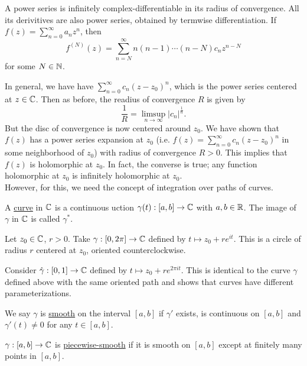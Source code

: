 \documentclass[11pt]{article}
\begin{document}
\begin{corollary}
A power series is infinitely complex-differentiable in its radius of
convergence. All its derivitives are also power series, obtained by termwise
differentiation. If $\displaystyle f(z) = \sum^\infty_{n=0}a_nz^n$, then
\begin{equation*}
f^{(N)}(z) = \sum^\infty_{n=N}n(n-1)\cdots(n-N)c_nz^{n-N}
\end{equation*}
for some $N \in \mathbb{N}$.
\end{corollary}
In general, we have have $\displaystyle \sum^\infty_{n=0} c_n(z - z_0)^n$, which
is the power series centered at $z \in \mathbb{C}$. Then as before, the readius of
convergence $R$ is given by
\begin{equation*}
\frac{1}{R} = \limsup_{n\to\infty} |c_n|^{\frac{1}{n}}.
\end{equation*}
But the disc of convergence is now centered around $z_0$. We have shown that
$f(z)$ has a power series expansion at $z_0$ (i.e. $\displaystyle f(z) =
\sum^\infty_{n=0}c_n(z - z_0)^n$ in some neighborhood of $z_0$) with radius of
convergence $R > 0$. This implies that $f(z)$ is holomorphic at $z_0$. In fact,
the converse is true; any function holomorphic at $z_0$ is infinitely
holomorphic at $z_0$.\\
However, for this, we need the concept of integration over paths of curves.
\begin{definition}
A \underline{curve} in $\mathbb{C}$ is a continuous uction $\gamma(t) : [a,b] \to \mathbb{C}$
with $a,b \in \mathbb{R}$. The image of $\gamma$ in $\mathbb{C}$ is called $\gamma^*$.
\end{definition}
\begin{example}
Let $z_0 \in \mathbb{C}$, $r > 0$. Take $\gamma: [0, 2\pi] \to \mathbb{C}$ defined by $t \mapsto
z_0 + re^{it}$. This is a circle of radius $r$ centered at $z_0$, oriented
counterclockwise.
\end{example}
\begin{example}
Consider $\hat\gamma: [0,1] \to \mathbb{C}$ defined by $t \mapsto z_0 + re^{2\pi it}$. This
is identical to the curve $\gamma$ defined above with the same oriented path and
shows that curves have different parameterizations.
\end{example}
\begin{definition}
We say $\gamma$ is \underline{smooth} on the interval $[a,b]$ if $\gamma'$
exists, is continuous on $[a,b]$ and $\gamma'(t) \neq 0$ for any $t \in [a,b]$.
\end{definition}
\begin{definition}
$\gamma: [a,b] \to \mathbb{C}$ is \underline{piecewise-smooth} if it is smooth on
$[a,b]$ except at finitely many points in $[a,b]$.
\end{definition}
\end{document}
